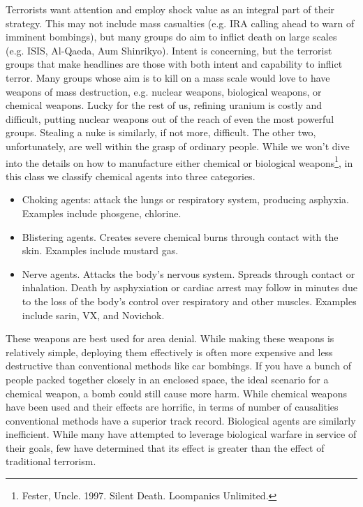 \documentclass[nobib]{tufte-handout}
\begin{document}
Terrorists want 
attention and employ shock value as an integral part of their 
strategy. This may not include mass casualties (e.g. IRA calling 
ahead to warn of imminent bombings), but many groups do aim 
to inflict death on large scales (e.g. ISIS, Al-Qaeda, Aum Shinrikyo). 
Intent is concerning, but the terrorist groups that make headlines 
are those with both intent and capability to inflict terror. 
Many groups whose aim is to kill on a mass scale would love 
to have weapons of mass destruction, e.g. nuclear weapons, biological 
weapons, or chemical weapons. Lucky for the rest of us, refining 
uranium is costly and difficult, putting nuclear weapons out of the 
reach of even the most powerful groups. Stealing a nuke is similarly, 
if not more, difficult. The other two, unfortunately, are well within 
the grasp of ordinary people. While we won't dive into the details on 
how to manufacture either chemical or biological 
weapons\footnote{Fester, Uncle. 1997. Silent Death. Loompanics Unlimited.}, 
in this class we classify chemical agents into three categories. 
\begin{itemize}
    \item Choking agents: attack the lungs or respiratory system, 
    producing asphyxia. Examples include phosgene, chlorine. 
    \item Blistering agents. Creates severe chemical burns 
    through contact with the skin. Examples include mustard gas. 
    \item Nerve agents. Attacks the body's nervous 
    system. Spreads through contact or inhalation. 
    Death by asphyxiation or cardiac arrest may 
    follow in minutes due to the loss of the body's 
    control over respiratory and other muscles. Examples include sarin, VX, 
    and Novichok. 
\end{itemize}
These weapons are best used for area denial. 
While making these weapons is relatively 
simple, deploying them effectively
is often more expensive and less destructive than 
conventional methods like car bombings. 
If you have a bunch of people packed together 
closely in an enclosed space, the ideal scenario 
for a chemical weapon, a bomb could still cause 
more harm. While chemical weapons have been used 
and their effects are horrific, in terms of number 
of causalities conventional methods have a superior 
track record. Biological agents are similarly 
inefficient. While many have attempted to leverage 
biological warfare in service of their goals, 
few have determined that its effect is greater 
than the effect of traditional terrorism. 
\end{document}
